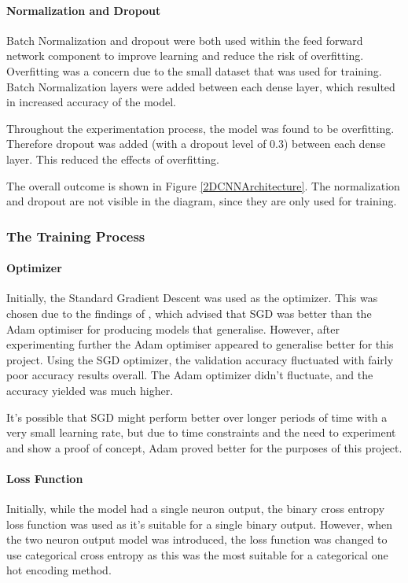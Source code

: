 \documentclass[11pt,a4paper]{article}
\begin{document}
                \paragraph{Normalization and Dropout}
                Batch Normalization and dropout were both used within the feed forward network component to improve learning and reduce the risk of overfitting. Overfitting was a concern due to the small dataset that was used for training.
                Batch Normalization layers were added between each dense layer, which resulted in increased accuracy of the model.



                Throughout the experimentation process, the model was found to be overfitting. Therefore dropout was added (with a dropout level of 0.3) between each dense layer. This reduced the effects of overfitting.

                The overall outcome is shown in Figure \ref{2DCNNArchitecture}. The normalization and dropout are not visible in the diagram, since they are only used for training.


            \subsubsection{The Training Process}
                \paragraph{Optimizer}
                Initially, the Standard Gradient Descent was used as the optimizer. This was chosen due to the findings of \cite{SGDBetterThanAdamForImageClassification},
                which advised that SGD was better than the Adam optimiser for producing models that generalise. However, after experimenting further the Adam optimiser appeared
                to generalise better for this project. Using the SGD optimizer, the validation accuracy fluctuated with fairly poor accuracy results overall. The Adam optimizer
                didn't fluctuate, and the accuracy yielded was much higher.

                It's possible that SGD might perform better over longer periods of time with a very small learning rate, but due to time constraints and the need to experiment and show a proof of concept,
                Adam proved better for the purposes of this project.


                \paragraph{Loss Function}
                    Initially, while the model had a single neuron output, the binary cross entropy loss function was used as it's suitable for a single binary output.
                    However, when the two neuron output model was introduced, the loss function was changed to use categorical cross entropy as this was the most suitable
                    for a categorical one hot encoding method.
\end{document}
